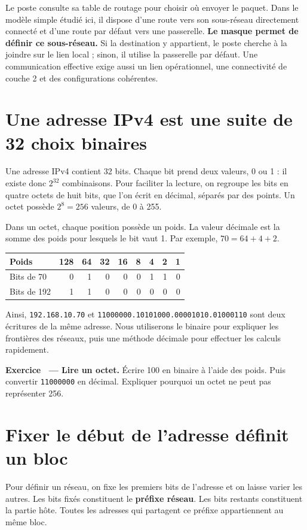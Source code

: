 \documentclass[11pt,a4paper]{article}
\newif\ifcorrige
\newcommand{\ip}[1]{\textcolor{ipred}{\texttt{#1}}}
\newcounter{exo}
\newcommand{\exo}[2]{%
  \Needspace{6cm}\stepcounter{exo}\begin{quest}\textbf{Exercice \theexo\ — #1.} #2\end{quest}}
\newcommand{\zone}[2]{%
  \ifcorrige
    \begin{tcolorbox}[colback=corrbg,colframe=corr,boxrule=0.6pt,arc=1pt,left=5pt,right=5pt,
      fontupper=\small\color{corr}]#2\end{tcolorbox}%
  \else
    \begin{tcolorbox}[colback=white,colframe=black!45,boxrule=0.5pt,arc=1pt,height=#1]\end{tcolorbox}%
  \fi}
\begin{document}
Le poste consulte sa table de routage pour choisir où envoyer le paquet. Dans le modèle simple
étudié ici, il dispose d'une route vers son sous-réseau directement connecté et d'une route par défaut
vers une passerelle. \textbf{Le masque permet de définir ce sous-réseau.}
Si la destination y appartient, le poste cherche à la joindre sur le lien local ; sinon, il utilise
la passerelle par défaut. Une communication effective exige aussi un lien opérationnel,
une connectivité de couche 2 et des configurations cohérentes.

\Needspace{6cm}
\section{Une adresse IPv4 est une suite de 32 choix binaires}
Une adresse IPv4 contient 32 bits. Chaque bit prend deux valeurs, 0 ou 1 : il existe donc
$2^{32}$ combinaisons. Pour faciliter la lecture, on regroupe les bits en quatre octets de huit bits,
que l'on écrit en décimal, séparés par des points. Un octet possède $2^8=256$ valeurs, de 0 à 255.

Dans un octet, chaque position possède un poids. La valeur décimale est la somme des poids
pour lesquels le bit vaut 1. Par exemple, $70=64+4+2$.
\begin{center}
\begin{tabular}{@{}lrrrrrrrr@{}}
\toprule
Poids & 128 & 64 & 32 & 16 & 8 & 4 & 2 & 1\\
\midrule
Bits de 70 & 0&1&0&0&0&1&1&0\\
Bits de 192 & 1&1&0&0&0&0&0&0\\
\bottomrule
\end{tabular}
\end{center}
Ainsi, \ip{192.168.10.70} et
\texttt{11000000.10101000.00001010.01000110} sont deux écritures de la même adresse.
Nous utiliserons le binaire pour expliquer les frontières des réseaux, puis une méthode décimale
pour effectuer les calculs rapidement.

\exo{Lire un octet}{Écrire 100 en binaire à l'aide des poids. Puis convertir \texttt{11000000} en décimal.
Expliquer pourquoi un octet ne peut pas représenter 256.}
\zone{1.7cm}{$100=64+32+4$, donc \texttt{01100100}. \texttt{11000000} vaut $128+64=192$.
La somme des huit poids vaut 255 ; représenter 256 exige un neuvième bit.}

\Needspace{6cm}
\section{Fixer le début de l'adresse définit un bloc}
Pour définir un réseau, on fixe les premiers bits de l'adresse et on laisse varier les autres.
Les bits fixés constituent le \textbf{préfixe réseau}. Les bits restants constituent la partie hôte.
Toutes les adresses qui partagent ce préfixe appartiennent au même bloc.
\end{document}
